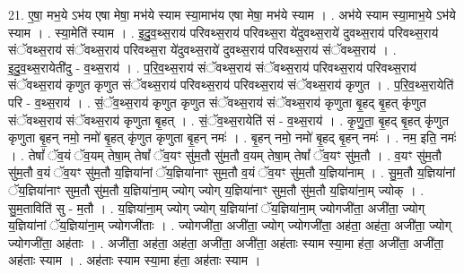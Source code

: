 \documentclass[17pt]{extarticle}
\begin{document}
21. ए॒षा॒ मभ॒ये ऽभ॑य एषा मेषा॒ मभ॑ये स्याम स्या॒माभ॑य एषा मेषा॒ मभ॑ये स्याम । . अभ॑ये स्याम स्या॒माभ॒ये ऽभ॑ये स्याम । . स्या॒मेति॑ स्याम । . इ॒दु॒व॒थ्स॒राय॑ परिवथ्स॒राय॑ परिवथ्स॒रा ये॑दुवथ्स॒राये॑ दुवथ्स॒राय॑ परिवथ्स॒राय॑ संॅवथ्स॒राय॑ संॅवथ्स॒राय॑ परिवथ्स॒रा ये॑दुवथ्स॒राये॑ दुवथ्स॒राय॑ परिवथ्स॒राय॑ संॅवथ्स॒राय॑ । . इ॒दु॒व॒थ्स॒रायेती॑दु - व॒थ्स॒राय॑ । . प॒रि॒व॒थ्स॒राय॑ संॅवथ्स॒राय॑ संॅवथ्स॒राय॑ परिवथ्स॒राय॑ परिवथ्स॒राय॑ संॅवथ्स॒राय॑ कृणुत कृणुत संॅवथ्स॒राय॑ परिवथ्स॒राय॑ परिवथ्स॒राय॑ संॅवथ्स॒राय॑ कृणुत । . प॒रि॒व॒थ्स॒रायेति॑ परि - व॒थ्स॒राय॑ । . सं॒ॅव॒थ्स॒राय॑ कृणुत कृणुत संॅवथ्स॒राय॑ संॅवथ्स॒राय॑ कृणुता बृ॒हद् बृ॒हत् कृ॑णुत संॅवथ्स॒राय॑ संॅवथ्स॒राय॑ कृणुता बृ॒हत् । . सं॒ॅव॒थ्स॒रायेति॑ सं - व॒थ्स॒राय॑ । . कृ॒णु॒ता॒ बृ॒हद् बृ॒हत् कृ॑णुत कृणुता बृ॒हन् नमो॒ नमो॑ बृ॒हत् कृ॑णुत कृणुता बृ॒हन् नमः॑ । . बृ॒हन् नमो॒ नमो॑ बृ॒हद् बृ॒हन् नमः॑ । . नम॒ इति॒ नमः॑ । . तेषां᳚ ॅव॒यं ॅव॒यम् तेषा॒म् तेषां᳚ ॅव॒यꣳ सु॑म॒तौ सु॑म॒तौ व॒यम् तेषा॒म् तेषां᳚ ॅव॒यꣳ सु॑म॒तौ । . व॒यꣳ सु॑म॒तौ सु॑म॒तौ व॒यं ॅव॒यꣳ सु॑म॒तौ य॒ज्ञिया॑नां ॅय॒ज्ञिया॑नाꣳ सुम॒तौ व॒यं ॅव॒यꣳ सु॑म॒तौ य॒ज्ञिया॑नाम् । . सु॒म॒तौ य॒ज्ञिया॑नां ॅय॒ज्ञिया॑नाꣳ सुम॒तौ सु॑म॒तौ य॒ज्ञिया॑ना॒म् ज्योग् ज्योग् य॒ज्ञिया॑नाꣳ सुम॒तौ सु॑म॒तौ य॒ज्ञिया॑ना॒म् ज्योक् । . सु॒म॒ताविति॑ सु - म॒तौ । . य॒ज्ञिया॑ना॒म् ज्योग् ज्योग् य॒ज्ञिया॑नां ॅय॒ज्ञिया॑ना॒म् ज्योगजी॑ता॒ अजी॑ता॒ ज्योग् य॒ज्ञिया॑नां ॅय॒ज्ञिया॑ना॒म् ज्योगजी॑ताः । . ज्योगजी॑ता॒ अजी॑ता॒ ज्योग् ज्योगजी॑ता॒ अह॑ता॒ अह॑ता॒ अजी॑ता॒ ज्योग् ज्योगजी॑ता॒ अह॑ताः । . अजी॑ता॒ अह॑ता॒ अह॑ता॒ अजी॑ता॒ अजी॑ता॒ अह॑ताः स्याम स्या॒मा ह॑ता॒ अजी॑ता॒ अजी॑ता॒ अह॑ताः स्याम । . अह॑ताः स्याम स्या॒मा ह॑ता॒ अह॑ताः स्याम । \newline
\end{document}
